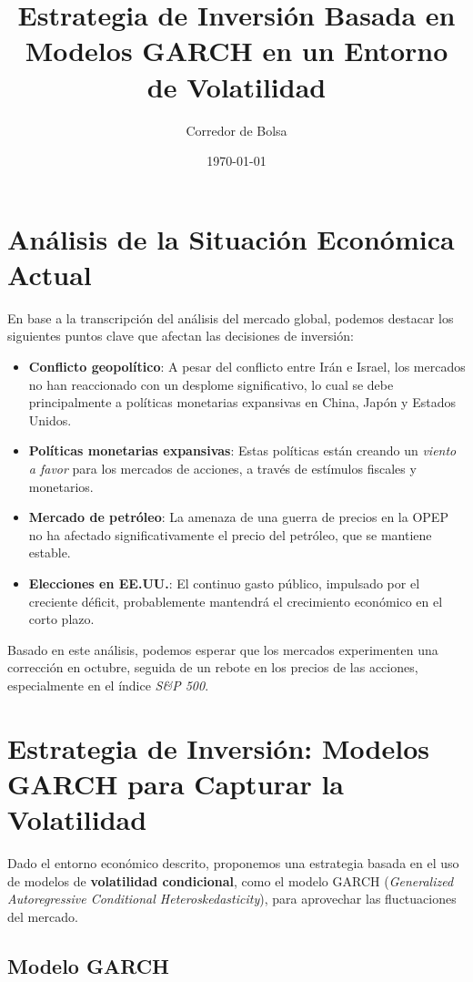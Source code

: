 \documentclass{article}
\title{Estrategia de Inversión Basada en Modelos GARCH en un Entorno de Volatilidad}
\author{Corredor de Bolsa}
\date{\today}
\begin{document}
\maketitle

\section{Análisis de la Situación Económica Actual}

En base a la transcripción del análisis del mercado global, podemos destacar los siguientes puntos clave que afectan las decisiones de inversión:

\begin{itemize}
    \item \textbf{Conflicto geopolítico}: A pesar del conflicto entre Irán e Israel, los mercados no han reaccionado con un desplome significativo, lo cual se debe principalmente a políticas monetarias expansivas en China, Japón y Estados Unidos.
    \item \textbf{Políticas monetarias expansivas}: Estas políticas están creando un \emph{viento a favor} para los mercados de acciones, a través de estímulos fiscales y monetarios.
    \item \textbf{Mercado de petróleo}: La amenaza de una guerra de precios en la OPEP no ha afectado significativamente el precio del petróleo, que se mantiene estable.
    \item \textbf{Elecciones en EE.UU.}: El continuo gasto público, impulsado por el creciente déficit, probablemente mantendrá el crecimiento económico en el corto plazo.
\end{itemize}

Basado en este análisis, podemos esperar que los mercados experimenten una corrección en octubre, seguida de un rebote en los precios de las acciones, especialmente en el índice \textit{S\&P 500}.

\section{Estrategia de Inversión: Modelos GARCH para Capturar la Volatilidad}

Dado el entorno económico descrito, proponemos una estrategia basada en el uso de modelos de \textbf{volatilidad condicional}, como el modelo GARCH (\textit{Generalized Autoregressive Conditional Heteroskedasticity}), para aprovechar las fluctuaciones del mercado.

\subsection{Modelo GARCH}
\end{document}
